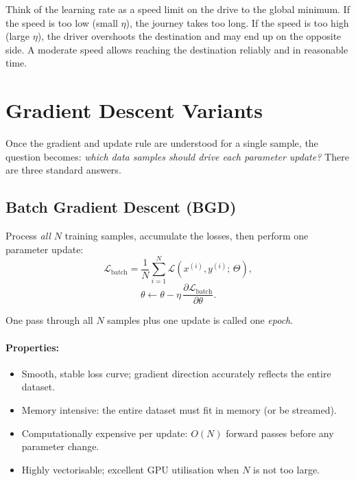 \documentclass[12pt,a4paper]{article}
\newcommand{\Loss}{\mathcal{L}}
\newcommand{\pderiv}[2]{\dfrac{\partial #1}{\partial #2}}
\begin{document}
\begin{keyinsight}[title=Learning rate as speed control]
Think of the learning rate as a speed limit on the drive to the global
minimum.
If the speed is too low (small $\eta$), the journey takes too long.
If the speed is too high (large $\eta$), the driver overshoots the
destination and may end up on the opposite side.
A moderate speed allows reaching the destination reliably and in
reasonable time.
\end{keyinsight}

\section{Gradient Descent Variants}
\label{sec:gd-variants}

Once the gradient and update rule are understood for a single sample,
the question becomes: \emph{which data samples should drive each parameter
update?}
There are three standard answers.

\subsection{Batch Gradient Descent (BGD)}

Process \emph{all} $N$ training samples, accumulate the losses, then perform
one parameter update:
\begin{equation}
  \Loss_{\text{batch}} = \frac{1}{N}\sum_{i=1}^{N}\Loss(x^{(i)}, y^{(i)};\,\Theta),
  \label{eq:bgd-loss}
\end{equation}
\begin{equation}
  \theta \leftarrow \theta - \eta\,\pderiv{\Loss_{\text{batch}}}{\theta}.
  \label{eq:bgd-update}
\end{equation}

One pass through all $N$ samples plus one update is called one
\emph{epoch}.

\paragraph{Properties:}
\begin{itemize}[leftmargin=2em]
  \item Smooth, stable loss curve; gradient direction accurately reflects
        the entire dataset.
  \item Memory intensive: the entire dataset must fit in memory
        (or be streamed).
  \item Computationally expensive per update: $O(N)$ forward passes
        before any parameter change.
  \item Highly vectorisable; excellent GPU utilisation when $N$ is not
        too large.
\end{itemize}
\end{document}
